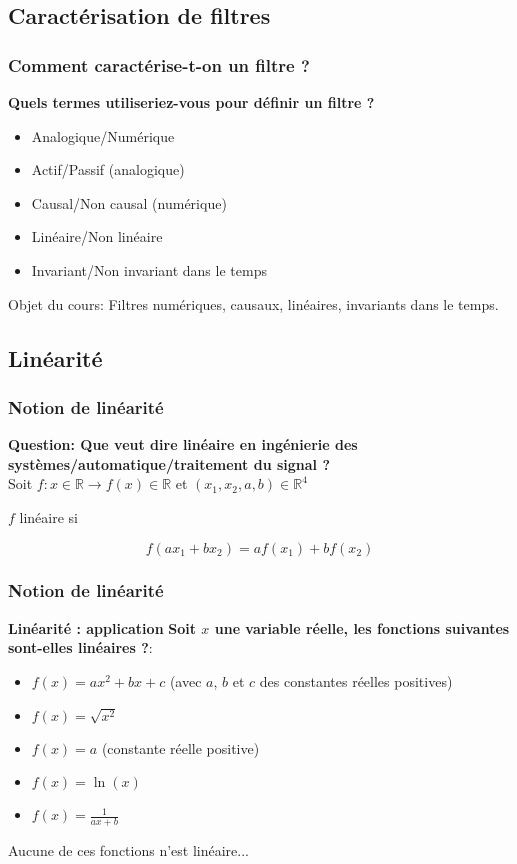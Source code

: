 \documentclass{beamer}
\begin{document}
\subsection{Caractérisation de filtres}
\begin{frame}
\frametitle{Comment caractérise-t-on un filtre ?}
\textbf{Quels termes utiliseriez-vous pour définir un filtre ?}
\vspace{1cm}
\begin{itemize}
\item<2-> Analogique/Numérique
\item<3-> Actif/Passif (analogique)
\item<4-> Causal/Non causal (numérique)
\item<5-> Linéaire/Non linéaire 
\item<6-> Invariant/Non invariant dans le temps
\end{itemize}
{
\begin{block}{}
Objet du cours: Filtres numériques, causaux, linéaires, invariants dans le temps.
\end{block}
}
\end{frame}



\subsection{Linéarité}
\begin{frame}
\frametitle{Notion de linéarité}
\textbf{Question: Que veut dire linéaire en ingénierie des systèmes/automatique/traitement du signal ? \label{linéaire ?} }\\
\vspace{1 cm}
{
Soit $f : x \in \mathbb{R} \rightarrow f(x) \in \mathbb{R} $ et $(x_1,x_2,a,b) \in \mathbb{R}^4$
\\}
\vspace{1 cm}
{
$f$ linéaire si\\
\vspace{0.5 cm}
\begin{block}{}
\[f(a x_1 + b x_2) = a f(x_1) + b f(x_2)\]
\end{block}
}

\end{frame}

\begin{frame}
\frametitle{Notion de linéarité}
 \textbf{Linéarité : application}
\textbf{Soit $x$ une variable réelle, les fonctions suivantes sont-elles linéaires ?}:
 \vspace{0.5cm}
\begin{itemize}
\item<2-> $f(x) = a x^2 + b x + c$ (avec $a$, $b$ et $c$ des constantes réelles positives)
\item<3-> $f(x) = \sqrt{x^2}$
\item<4-> $f(x) = a$ (constante réelle positive)
\item<5-> $f(x) = \ln(x)$
\item<6-> $f(x) = \frac{1}{a x + b}$
\end{itemize}
\vspace{1cm}
{
Aucune de ces fonctions n'est linéaire...
}
\end{frame}
\end{document}
